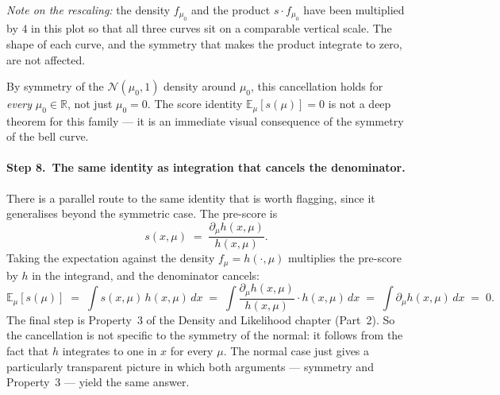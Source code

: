 \documentclass[a4paper,oneside,12pt]{extarticle}
\theoremstyle{plain}
\theoremstyle{definition}
\theoremstyle{remark}
\newcommand*{\E}{\mathbb{E}}
\begin{document}
\begin{center}
\end{center}

\noindent\emph{Note on the rescaling:} the density $f_{\mu_0}$ and
the product $s\cdot f_{\mu_0}$ have been multiplied by $4$ in this
plot so that all three curves sit on a comparable vertical scale.
The shape of each curve, and the symmetry that makes the product
integrate to zero, are not affected.

By symmetry of the $\mathcal{N}(\mu_0, 1)$ density around $\mu_0$,
this cancellation holds for \emph{every} $\mu_0 \in \mathbb{R}$,
not just $\mu_0 = 0$.  The score identity $\E_\mu[s(\mu)] = 0$ is
not a deep theorem for this family --- it is an immediate visual
consequence of the symmetry of the bell curve.

\paragraph{Step 8.\ The same identity as integration that cancels the denominator.}
There is a parallel route to the same identity that is worth
flagging, since it generalises beyond the symmetric case.  The
pre-score is
\[
  s(x,\mu) \;=\; \frac{\partial_\mu h(x,\mu)}{h(x,\mu)}.
\]
Taking the expectation against the density $f_\mu = h(\cdot, \mu)$
multiplies the pre-score by $h$ in the integrand, and the
denominator cancels:
\[
  \E_\mu[s(\mu)]
  \;=\; \int s(x, \mu)\,h(x, \mu)\,dx
  \;=\; \int \frac{\partial_\mu h(x,\mu)}{h(x,\mu)}\cdot h(x,\mu)\,dx
  \;=\; \int \partial_\mu h(x,\mu)\,dx
  \;=\; 0.
\]
The final step is Property~3 of
the Density and Likelihood chapter (Part~2).  So the cancellation is
not specific to the symmetry of the normal: it follows from the
fact that $h$ integrates to one in $x$ for every $\mu$.  The normal
case just gives a particularly transparent picture in which both
arguments --- symmetry and Property~3 --- yield the same answer.
\end{document}
